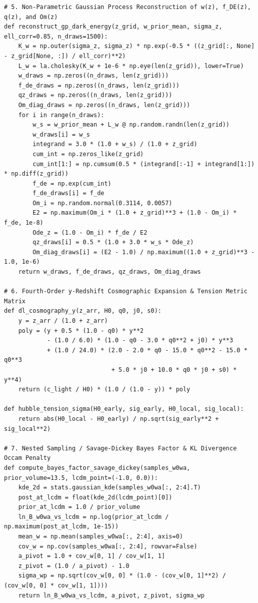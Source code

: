 \documentclass[11pt,letterpaper]{article}
\begin{document}
\begin{lstlisting}
# 5. Non-Parametric Gaussian Process Reconstruction of w(z), f_DE(z), q(z), and Om(z)
def reconstruct_gp_dark_energy(z_grid, w_prior_mean, sigma_z, ell_corr=0.85, n_draws=1500):
    K_w = np.outer(sigma_z, sigma_z) * np.exp(-0.5 * ((z_grid[:, None] - z_grid[None, :]) / ell_corr)**2)
    L_w = la.cholesky(K_w + 1e-6 * np.eye(len(z_grid)), lower=True)
    w_draws = np.zeros((n_draws, len(z_grid)))
    f_de_draws = np.zeros((n_draws, len(z_grid)))
    qz_draws = np.zeros((n_draws, len(z_grid)))
    Om_diag_draws = np.zeros((n_draws, len(z_grid)))
    for i in range(n_draws):
        w_s = w_prior_mean + L_w @ np.random.randn(len(z_grid))
        w_draws[i] = w_s
        integrand = 3.0 * (1.0 + w_s) / (1.0 + z_grid)
        cum_int = np.zeros_like(z_grid)
        cum_int[1:] = np.cumsum(0.5 * (integrand[:-1] + integrand[1:]) * np.diff(z_grid))
        f_de = np.exp(cum_int)
        f_de_draws[i] = f_de
        Om_i = np.random.normal(0.3114, 0.0057)
        E2 = np.maximum(Om_i * (1.0 + z_grid)**3 + (1.0 - Om_i) * f_de, 1e-8)
        Ode_z = (1.0 - Om_i) * f_de / E2
        qz_draws[i] = 0.5 * (1.0 + 3.0 * w_s * Ode_z)
        Om_diag_draws[i] = (E2 - 1.0) / np.maximum((1.0 + z_grid)**3 - 1.0, 1e-6)
    return w_draws, f_de_draws, qz_draws, Om_diag_draws

# 6. Fourth-Order y-Redshift Cosmographic Expansion & Tension Metric Matrix
def dl_cosmography_y(z_arr, H0, q0, j0, s0):
    y = z_arr / (1.0 + z_arr)
    poly = (y + 0.5 * (1.0 - q0) * y**2
            - (1.0 / 6.0) * (1.0 - q0 - 3.0 * q0**2 + j0) * y**3
            + (1.0 / 24.0) * (2.0 - 2.0 * q0 - 15.0 * q0**2 - 15.0 * q0**3
                              + 5.0 * j0 + 10.0 * q0 * j0 + s0) * y**4)
    return (c_light / H0) * (1.0 / (1.0 - y)) * poly

def hubble_tension_sigma(H0_early, sig_early, H0_local, sig_local):
    return abs(H0_local - H0_early) / np.sqrt(sig_early**2 + sig_local**2)

# 7. Nested Sampling / Savage-Dickey Bayes Factor & KL Divergence Occam Penalty
def compute_bayes_factor_savage_dickey(samples_w0wa, prior_volume=13.5, lcdm_point=(-1.0, 0.0)):
    kde_2d = stats.gaussian_kde(samples_w0wa[:, 2:4].T)
    post_at_lcdm = float(kde_2d(lcdm_point)[0])
    prior_at_lcdm = 1.0 / prior_volume
    ln_B_w0wa_vs_lcdm = np.log(prior_at_lcdm / np.maximum(post_at_lcdm, 1e-15))
    mean_w = np.mean(samples_w0wa[:, 2:4], axis=0)
    cov_w = np.cov(samples_w0wa[:, 2:4], rowvar=False)
    a_pivot = 1.0 + cov_w[0, 1] / cov_w[1, 1]
    z_pivot = (1.0 / a_pivot) - 1.0
    sigma_wp = np.sqrt(cov_w[0, 0] * (1.0 - (cov_w[0, 1]**2) / (cov_w[0, 0] * cov_w[1, 1])))
    return ln_B_w0wa_vs_lcdm, a_pivot, z_pivot, sigma_wp
\end{lstlisting}
\end{document}

